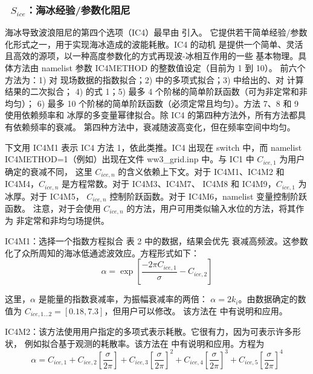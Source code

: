 \vsssub
\subsubsection{~$S_{ice}$：海冰经验/参数化阻尼} \label{sec:ICE4}
\vsssub


\noindent
海冰导致波浪阻尼的第四个选项（{\code IC4}）最早由 \cite{rep:CR17} 引入。
它提供若干简单经验/参数化形式之一，用于实现海冰造成的波能耗散。{\code IC4} 的动机
是提供一个简单、灵活且高效的源项，以一种高度参数化的方式再现波-冰相互作用的一些
基本物理。具体方法由 namelist 参数 {\code IC4METHOD} 的整数值设定（目前为 1 到 10）。
前六个方法为：1) 对 \cite{art:WAD88} 现场数据的指数拟合；2) \cite{art:MBK14}
中的多项式拟合；3) \cite{art:HT15} 中给出的、对 \cite{art:KM08} 计算结果的二次拟合；
4) \cite{art:Ko14} 的式 1；5) 最多 4 个阶梯的简单阶跃函数（可为非定常和非均匀）；
6) 最多 10 个阶梯的简单阶跃函数（必须定常且均匀）。方法 7、8 和 9 使用依赖频率和
冰厚的多变量幂律拟合。除 {\code IC4} 的第四种方法外，所有方法都具有依赖频率的衰减。
第四种方法中，衰减随波高变化，但在频率空间中均匀。

下文用 {\code IC4M1} 表示 {\code IC4} 方法 1，依此类推。{\code IC4} 出现在
{\file switch} 中，而 namelist {\code IC4METHOD=1}（例如）出现在文件
{\file ww3\_grid.inp} 中。与 {\code IC1} 中 ${C_{ice,1}}$ 为用户确定的衰减不同，
这里 ${C_{ice,n}}$ 的含义依赖上下文。对于 {\code IC4M1}、{\code IC4M2} 和
{\code IC4M4}，${C_{ice,n}}$ 是方程常数。对于 {\code IC4M3}、{\code IC4M7}、
{\code IC4M8} 和 {\code IC4M9}，${C_{ice,1}}$ 为冰厚。对于 {\code IC4M5}，
${C_{ice,n}}$ 控制阶跃函数。对于 {\code IC4M6}，namelist 变量控制阶跃函数。
注意，对于会使用 ${C_{ice,n}}$ 的方法，用户可用类似输入水位的方法，将其作为
非定常和非均匀场提供。

{\code IC4M1}：选择一个指数方程拟合 \cite{art:WAD88} 表 2 中的数据，结果会优先
衰减高频波。这参数化了众所周知的海冰低通滤波效应。方程形式如下：
\begin{equation}\label{eq:ice1}
  {\alpha} = \exp\left[\frac{-{2\pi}C_{ice, 1}}{{\sigma}} - C_{ice, 2}\right]
\end{equation}

\noindent 这里，$\alpha$ 是能量的指数衰减率，为振幅衰减率的两倍：
$\alpha = 2k_i$。由数据确定的数值为 ${C_{ice,1...2}}=[0.18, 7.3]$，但用户可以修改。
该方法在 \cite{rep:CR17} 中有说明和应用。

{\code IC4M2}：该方法使用用户指定的多项式表示耗散。它很有力，因为可表示许多形状，
例如拟合基于观测的耗散率。该方法在 \cite{rep:CR17} 中有说明和应用。方程为
\begin{equation}\label{eq:ice2}
  {\alpha} = C_{ice,1} + C_{ice,2}\left[{\frac{\sigma}{2\pi}}\right] + C_{ice,3}\left[{\frac{\sigma}{2\pi}}\right]^2 + C_{ice,4}\left[{\frac{\sigma}{2\pi}}\right]^3 + C_{ice,5}\left[{\frac{\sigma}{2\pi}}\right]^4
\end{equation}

